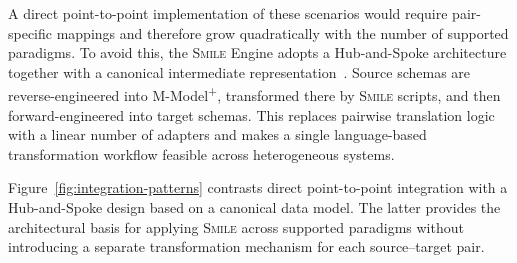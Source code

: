 \documentclass{llncs}
\begin{document}
A direct point-to-point implementation of these scenarios would require pair-specific mappings and therefore grow quadratically with the number of supported paradigms. To avoid this, the \textsc{Smile} Engine adopts a Hub-and-Spoke architecture together with a canonical intermediate representation~\cite{hohpe2004enterprise}. Source schemas are reverse-engineered into M-Model\textsuperscript{+}, transformed there by \textsc{Smile} scripts, and then forward-engineered into target schemas. This replaces pairwise translation logic with a linear number of adapters and makes a single language-based transformation workflow feasible across heterogeneous systems.

Figure~\ref{fig:integration-patterns} contrasts direct point-to-point integration with a Hub-and-Spoke design based on a canonical data model. The latter provides the architectural basis for applying \textsc{Smile} across supported paradigms without introducing a separate transformation mechanism for each source--target pair.
\end{document}
